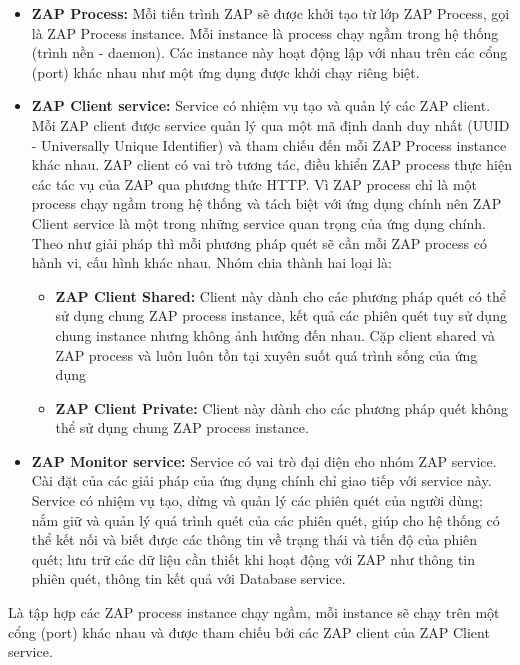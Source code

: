 \begin{itemize}
      \item \textbf{ZAP Process:} Mỗi tiến trình ZAP sẽ được khởi tạo từ lớp ZAP Process, gọi là ZAP Process instance.
            Mỗi instance là process chạy ngầm trong hệ thống (trình nền - daemon).
            Các instance này hoạt động lập với nhau trên các cổng (port) khác nhau như một ứng dụng được khởi chạy riêng biệt.
      \item \textbf{ZAP Client service:} Service có nhiệm vụ tạo và quản lý các ZAP client.
            Mỗi ZAP client được service quản lý qua một mã định danh duy nhất (UUID - Universally Unique Identifier) và tham chiếu đến mỗi ZAP Process instance khác nhau.
            ZAP client có vai trò tương tác, điều khiển ZAP process thực hiện các tác vụ của ZAP qua phương thức HTTP.
            Vì ZAP process chỉ là một process chạy ngầm trong hệ thống và tách biệt với ứng dụng chính nên ZAP Client service là một trong những service quan trọng của ứng dụng chính.
            Theo như giải pháp thì mỗi phương pháp quét sẽ cần mỗi ZAP process có hành vi, cấu hình khác nhau.
            Nhóm chia thành hai loại là:
            \begin{itemize}
                  \item \textbf{ZAP Client Shared:} Client này dành cho các phương pháp quét có thể sử dụng chung ZAP process instance, kết quả các phiên quét tuy sử dụng chung instance nhưng không ảnh hưởng đến nhau.
                        Cặp client shared và ZAP process và luôn luôn tồn tại xuyên suốt quá trình sống của ứng dụng
                  \item \textbf{ZAP Client Private:} Client này dành cho các phương pháp quét không thể sử dụng chung ZAP process instance.
            \end{itemize}
      \item \textbf{ZAP Monitor service:} Service có vai trò đại diện cho nhóm ZAP service.
            Cài đặt của các giải pháp của ứng dụng chính chỉ giao tiếp với service này.
            Service có nhiệm vụ tạo, dừng và quản lý các phiên quét của người dùng; nắm giữ và quản lý quá trình quét của các phiên quét, giúp cho hệ thống có thể kết nối và biết được các thông tin về trạng thái và tiến độ của phiên quét; lưu trữ các dữ liệu cần thiết khi hoạt động với ZAP như thông tin phiên quét, thông tin kết quả với Database service.
\end{itemize}

\tab \tab Là tập hợp các ZAP process instance chạy ngầm, mỗi instance sẽ chạy trên một cổng (port) khác nhau và được tham chiếu bởi các ZAP client của ZAP Client service.
\par

